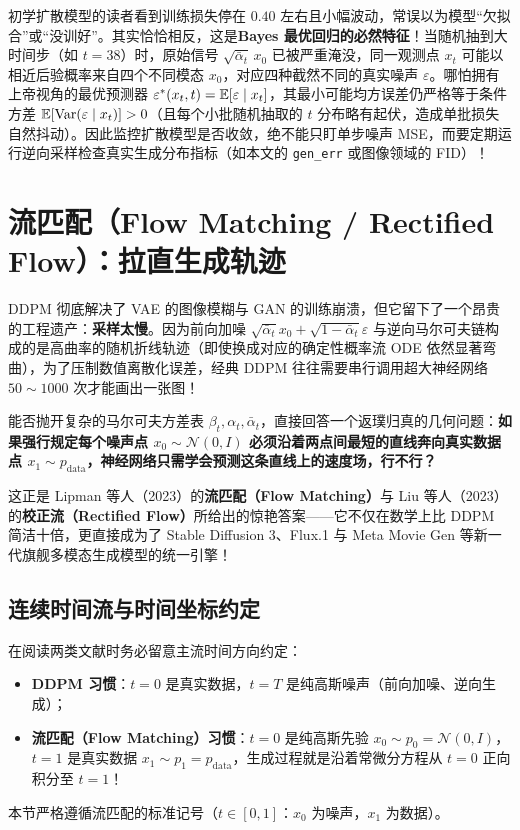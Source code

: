 \begin{remark}
初学扩散模型的读者看到训练损失停在 $0.40$ 左右且小幅波动，常误以为模型“欠拟合”或“没训好”。其实恰恰相反，这是\textbf{Bayes 最优回归的必然特征}！当随机抽到大时间步（如 $t = 38$）时，原始信号 $\sqrt{\bar{\alpha}_t}\,x_0$ 已被严重淹没，同一观测点 $x_t$ 可能以相近后验概率来自四个不同模态 $x_0$，对应四种截然不同的真实噪声 $\varepsilon$。哪怕拥有上帝视角的最优预测器 $\varepsilon^*(x_t, t) = \mathbb{E}[\varepsilon \mid x_t]$，其最小可能均方误差仍严格等于条件方差 $\mathbb{E}[\operatorname{Var}(\varepsilon \mid x_t)] > 0$（且每个小批随机抽取的 $t$ 分布略有起伏，造成单批损失自然抖动）。因此监控扩散模型是否收敛，绝不能只盯单步噪声 MSE，而要定期运行逆向采样检查真实生成分布指标（如本文的 \texttt{gen\_err} 或图像领域的 FID）！
\end{remark}

\section{流匹配（Flow Matching / Rectified Flow）：拉直生成轨迹}
\label{sec:flow-matching}

DDPM 彻底解决了 VAE 的图像模糊与 GAN 的训练崩溃，但它留下了一个昂贵的工程遗产：\textbf{采样太慢}。因为前向加噪 $\sqrt{\bar{\alpha}_t} x_0 + \sqrt{1-\bar{\alpha}_t}\varepsilon$ 与逆向马尔可夫链构成的是高曲率的随机折线轨迹（即使换成对应的确定性概率流 ODE 依然显著弯曲），为了压制数值离散化误差，经典 DDPM 往往需要串行调用超大神经网络 $50 \sim 1000$ 次才能画出一张图！

能否抛开复杂的马尔可夫方差表 $\beta_t, \alpha_t, \bar{\alpha}_t$，直接回答一个返璞归真的几何问题：\textbf{如果强行规定每个噪声点 $x_0 \sim \mathcal{N}(0, I)$ 必须沿着两点间最短的直线奔向真实数据点 $x_1 \sim p_{\text{data}}$，神经网络只需学会预测这条直线上的速度场，行不行？}

这正是 Lipman 等人（2023）的\textbf{流匹配（Flow Matching）}与 Liu 等人（2023）的\textbf{校正流（Rectified Flow）}所给出的惊艳答案——它不仅在数学上比 DDPM 简洁十倍，更直接成为了 Stable Diffusion 3、Flux.1 与 Meta Movie Gen 等新一代旗舰多模态生成模型的统一引擎！

\subsection{连续时间流与时间坐标约定}

\begin{remark}
在阅读两类文献时务必留意主流时间方向约定：
\begin{itemize}
  \item \textbf{DDPM 习惯}：$t = 0$ 是真实数据，$t = T$ 是纯高斯噪声（前向加噪、逆向生成）；
  \item \textbf{流匹配（Flow Matching）习惯}：$t = 0$ 是纯高斯先验 $x_0 \sim p_0 = \mathcal{N}(0, I)$，$t = 1$ 是真实数据 $x_1 \sim p_1 = p_{\text{data}}$，生成过程就是沿着常微分方程从 $t = 0$ 正向积分至 $t = 1$！
\end{itemize}
本节严格遵循流匹配的标准记号（$t \in [0, 1]$：$x_0$ 为噪声，$x_1$ 为数据）。
\end{remark}

